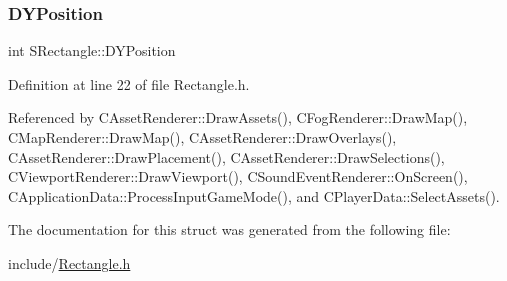 \subsubsection{\texorpdfstring{D\+Y\+Position}{DYPosition}}
{\footnotesize\ttfamily int S\+Rectangle\+::\+D\+Y\+Position}



Definition at line 22 of file Rectangle.\+h.



Referenced by C\+Asset\+Renderer\+::\+Draw\+Assets(), C\+Fog\+Renderer\+::\+Draw\+Map(), C\+Map\+Renderer\+::\+Draw\+Map(), C\+Asset\+Renderer\+::\+Draw\+Overlays(), C\+Asset\+Renderer\+::\+Draw\+Placement(), C\+Asset\+Renderer\+::\+Draw\+Selections(), C\+Viewport\+Renderer\+::\+Draw\+Viewport(), C\+Sound\+Event\+Renderer\+::\+On\+Screen(), C\+Application\+Data\+::\+Process\+Input\+Game\+Mode(), and C\+Player\+Data\+::\+Select\+Assets().



The documentation for this struct was generated from the following file\+:\begin{DoxyCompactItemize}
\item 
include/\hyperlink{Rectangle_8h}{Rectangle.\+h}\end{DoxyCompactItemize}
